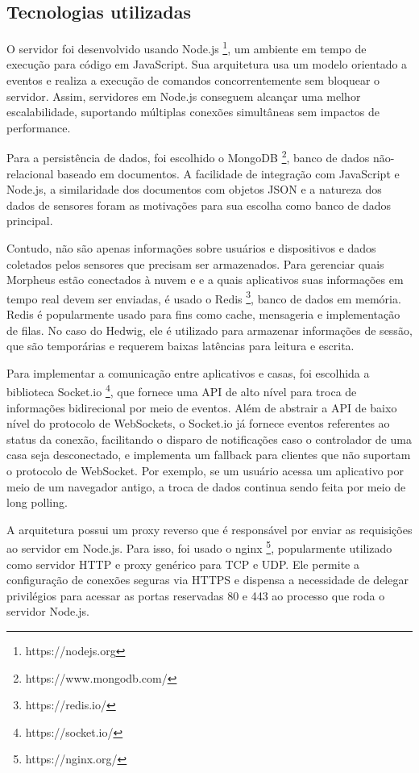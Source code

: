 \subsection{Tecnologias utilizadas}

O servidor foi desenvolvido usando Node.js \footnote{https://nodejs.org}, um ambiente em tempo de execução para código em JavaScript. Sua arquitetura usa um modelo orientado a eventos e realiza a execução de comandos concorrentemente sem bloquear o servidor. Assim, servidores em Node.js conseguem alcançar uma melhor escalabilidade, suportando múltiplas conexões simultâneas sem impactos de performance.

Para a persistência de dados, foi escolhido o MongoDB \footnote{https://www.mongodb.com/}, banco de dados não-relacional baseado em documentos. A facilidade de integração com JavaScript e Node.js, a similaridade dos documentos com objetos JSON e a natureza dos dados de sensores foram as motivações para sua escolha como banco de dados principal.

Contudo, não são apenas informações sobre usuários e dispositivos e dados coletados pelos sensores que precisam ser armazenados. Para gerenciar quais Morpheus estão conectados à nuvem e e a quais aplicativos suas informações em tempo real devem ser enviadas, é usado o Redis \footnote{https://redis.io/}, banco de dados em memória. Redis é popularmente usado para fins como cache, mensageria e implementação de filas. No caso do Hedwig, ele é utilizado para armazenar informações de sessão, que são temporárias e requerem baixas latências para leitura e escrita.

Para implementar a comunicação entre aplicativos e casas, foi escolhida a biblioteca Socket.io \footnote{https://socket.io/}, que fornece uma API de alto nível para troca de informações bidirecional por meio de eventos. Além de abstrair a API de baixo nível do protocolo de WebSockets, o Socket.io já fornece eventos referentes ao status da conexão, facilitando o disparo de notificações caso o controlador de uma casa seja desconectado, e implementa um fallback para clientes que não suportam o protocolo de WebSocket. Por exemplo, se um usuário acessa um aplicativo por meio de um navegador antigo, a troca de dados continua sendo feita por meio de long polling.

A arquitetura possui um proxy reverso que é responsável por enviar as requisições ao servidor em Node.js. Para isso, foi usado o nginx \footnote{https://nginx.org/}, popularmente utilizado como servidor HTTP e proxy genérico para TCP e UDP. Ele permite a configuração de conexões seguras via HTTPS e dispensa a necessidade de delegar privilégios para acessar as portas reservadas 80 e 443 ao processo que roda o servidor Node.js.

